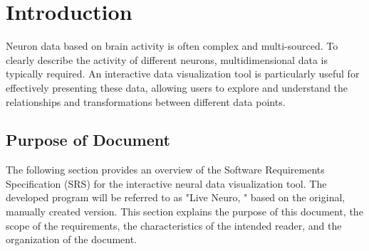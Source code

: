 \documentclass[12pt]{article}
\begin{document}
%
%
%
%
%

\section{Introduction}
Neuron data based on brain activity is often complex and multi-sourced. To clearly describe the
activity of different neurons, multidimensional data is typically required. An interactive data
visualization tool is particularly useful for effectively presenting these data, allowing users to
explore and understand the relationships and transformations between different data points.

\subsection{Purpose of Document}

The following section provides an overview of the Software Requirements Specification  (SRS)  for
the interactive neural data visualization tool. The developed program will be referred to as "Live Neuro, "
based on the original, manually created version. This section explains the purpose of this
document, the scope of the requirements, the characteristics of the intended reader, and the
organization of the document.
\end{document}

